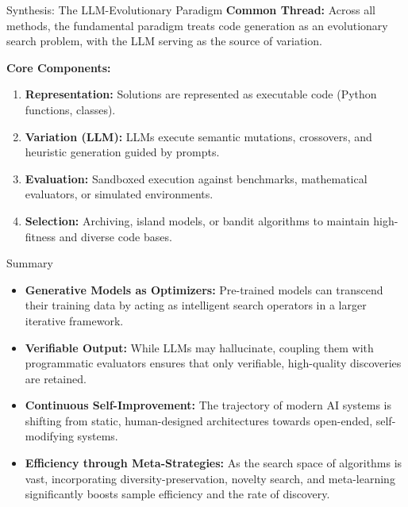 \documentclass[main]{subfiles}
\begin{document}
\begin{frame}{Synthesis: The LLM-Evolutionary Paradigm}
    \textbf{Common Thread:}
    Across all methods, the fundamental paradigm treats code generation as an evolutionary search problem, with the LLM serving as the source of variation.

    \pause
    \textbf{Core Components:}
    \begin{enumerate}
        \item \textbf{Representation:} Solutions are represented as executable code (Python functions, classes).
        \pause
        \item \textbf{Variation (LLM):} LLMs execute semantic mutations, crossovers, and heuristic generation guided by prompts.
        \pause
        \item \textbf{Evaluation:} Sandboxed execution against benchmarks, mathematical evaluators, or simulated environments.
        \pause
        \item \textbf{Selection:} Archiving, island models, or bandit algorithms to maintain high-fitness and diverse code bases.
    \end{enumerate}
    
\end{frame}

\begin{frame}{Summary}
    \begin{itemize}
        \item \textbf{Generative Models as Optimizers:} Pre-trained models can transcend their training data by acting as intelligent search operators in a larger iterative framework.
        \pause
        \item \textbf{Verifiable Output:} While LLMs may hallucinate, coupling them with programmatic evaluators ensures that only verifiable, high-quality discoveries are retained.
        \pause
        \item \textbf{Continuous Self-Improvement:} The trajectory of modern AI systems is shifting from static, human-designed architectures towards open-ended, self-modifying systems.
        \pause
        \item \textbf{Efficiency through Meta-Strategies:} As the search space of algorithms is vast, incorporating diversity-preservation, novelty search, and meta-learning significantly boosts sample efficiency and the rate of discovery.
    \end{itemize}
    
    
\end{frame}
\end{document}

